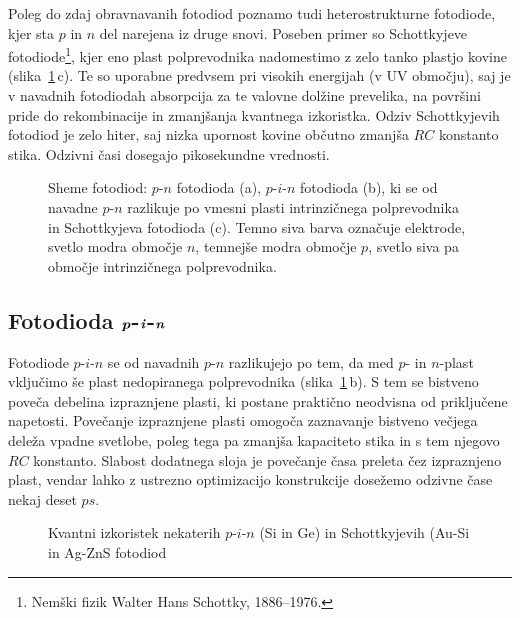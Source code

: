 \begin{remark}
Poleg do zdaj obravnavanih fotodiod poznamo tudi heterostrukturne 
fotodiode, kjer sta $p$ in $n$ del
narejena iz druge snovi. Poseben primer so Schottkyjeve fotodiode\footnote{Nemški fizik
Walter Hans Schottky, 1886--1976.}, kjer eno plast polprevodnika
nadomestimo z zelo tanko plastjo kovine (slika~\ref{11_shema}\,c). Te so uporabne predvsem pri 
visokih energijah (v UV območju), 
saj je v navadnih fotodiodah absorpcija za te valovne dolžine prevelika, na površini pride do 
rekombinacije in zmanjšanja kvantnega izkoristka. Odziv Schottkyjevih fotodiod je zelo hiter, 
saj nizka upornost kovine občutno zmanjša $RC$ konstanto stika. Odzivni časi dosegajo pikosekundne vrednosti. 
\end{remark}

\begin{figure}[h]
\centering
\def\svgwidth{140truemm} 

\caption{Sheme fotodiod: $p$-$n$ fotodioda (a), $p$-$i$-$n$ fotodioda (b),  ki se od 
navadne $p$-$n$ razlikuje po vmesni plasti intrinzičnega
polprevodnika in Schottkyjeva fotodioda (c). 
Temno siva barva označuje elektrode, svetlo modra območje $n$, 
temnejše modra območje $p$, svetlo siva pa območje intrinzičnega polprevodnika. }
\label{11_shema}
\end{figure}

\subsection*{Fotodioda $\textbf{\textit{p}}$-$\textbf{\textit{i}}$-$\textbf{\textit{n}}$}
Fotodiode $p$-$i$-$n$ se od navadnih $p$-$n$ razlikujejo po tem, da med $p$- in $n$-plast 
vključimo še plast nedopiranega polprevodnika (slika~\ref{11_shema}\,b). 
S tem se bistveno poveča debelina
izpraznjene plasti, ki postane praktično neodvisna od priključene napetosti.
Povečanje izpraznjene plasti omogoča zaznavanje bistveno večjega deleža vpadne svetlobe, 
poleg tega pa zmanjša kapaciteto stika in s tem njegovo $RC$ konstanto. Slabost dodatnega
sloja je povečanje časa preleta čez izpraznjeno plast, vendar lahko
z ustrezno optimizacijo konstrukcije dosežemo odzivne čase nekaj deset $\si{ps}$.

\begin{figure}[h]
\centering
\def\svgwidth{100truemm} 

\caption{Kvantni izkoristek nekaterih $p$-$i$-$n$ (Si in Ge) in Schottkyjevih (Au-Si in Ag-ZnS 
fotodiod}
\label{11_odziv}
\end{figure}

